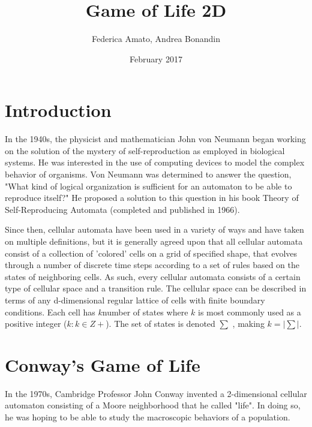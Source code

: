 \documentclass{report}%
\begin{document}
\title{Game of Life 2D}
\author{Federica Amato, Andrea Bonandin}
\date{February 2017}
\maketitle
\tableofcontents


\chapter{Introduction}
In the 1940s, the physicist and mathematician John von Neumann began working
on the solution of the mystery of self-reproduction as employed in biological systems. He was
interested in the use of computing devices to model the complex behavior of organisms.
Von Neumann was determined to answer the question, "What kind of logical organization is sufficient for
an automaton to be able to reproduce itself?" He proposed a solution to this question in
his book Theory of Self-Reproducing Automata (completed and published in 1966).

\noindent Since then, cellular automata have been used in a variety of ways and have taken on multiple
definitions, but it is generally agreed upon that all cellular automata consist of a collection of
'colored' cells on a grid of specified shape, that evolves through a number of discrete time steps
according to a set of rules based on the states of neighboring cells. As such, every cellular
automata consists of a certain type of cellular space and a transition rule. The cellular space can
be described in terms of any d-dimensional regular lattice of cells with finite boundary conditions.
Each cell has $k $number of states where $k$ is most commonly used as a positive integer ($k : k \in Z+$). The set of states is denoted $\sum$ , making $k = |\sum|$. 

\chapter{Conway's Game of Life}

In the 1970s, Cambridge Professor John Conway invented a 2-dimensional cellular automaton consisting of a Moore neighborhood that he called "life". In doing so, he was hoping to be able to study the macroscopic behaviors of a population.
\end{document}
